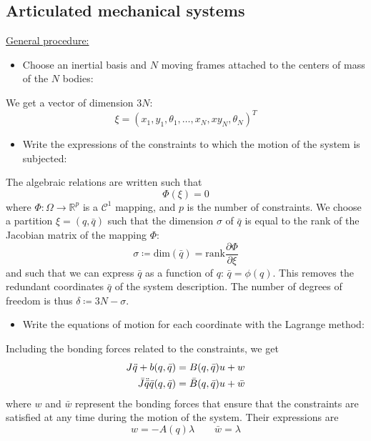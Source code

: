\documentclass[12pt, openany]{report}
\theoremstyle{definition}
\newcommand{\R}{\mathbb{R}}
\begin{document}
\subsection{Articulated mechanical systems}
\underline{General procedure:}
\begin{itemize}
    \item Choose an inertial basis and $N$ moving frames attached to the centers of mass of the $N$ bodies:
\end{itemize}
We get a vector of dimension $3N$:
\begin{equation}
    \xi = (x_1, y_1,\theta_1,\dots, x_N,xy_N,\theta_N)^T
\end{equation}
\begin{itemize}
    \item Write the expressions of the constraints to which the motion of the system is subjected:
\end{itemize}
The algebraic relations are written such that 
\begin{equation}
    \Phi(\xi)=0
\end{equation}
where $\Phi:\Omega \rightarrow \R^p$ is a $\mathcal{C}^1$ mapping, and $p$ is the number of constraints. We choose a partition $\xi = (q,\bar q)$ such that the dimension $\sigma$ of $\bar q$ is equal to the rank of the Jacobian matrix of the mapping $\Phi$:
\begin{equation}
    \sigma \coloneqq \text{dim}(\bar q)= \text{rank}\frac{\partial \Phi}{\partial \xi}
\end{equation}
and such that we can express $\bar q$ as a function of $q$: $\bar q=\phi(q)$. This removes the redundant coordinates $\bar q$ of the system description. The number of degrees of freedom is thus $\delta\coloneqq 3N-\sigma$. 
\begin{itemize}
    \item Write the equations of motion for each coordinate with the Lagrange method:
\end{itemize}
Including the bonding forces related to the constraints, we get
\begin{align}
    J\ddot q +b(q,\bar q)&=B(q,\bar q)u+w\\
    \bar J \Ddot{\bar q}\bar q(q,\bar q) &= \bar B(q,\bar q)u+\bar w\\
\end{align}
where $w$ and $\bar w$ represent the bonding forces that ensure that the constraints are satisfied at any time during the motion of the system. Their expressions are 
\begin{equation}
    w=-A(q)\lambda \qquad \bar w=\lambda
\end{equation}
\end{document}
